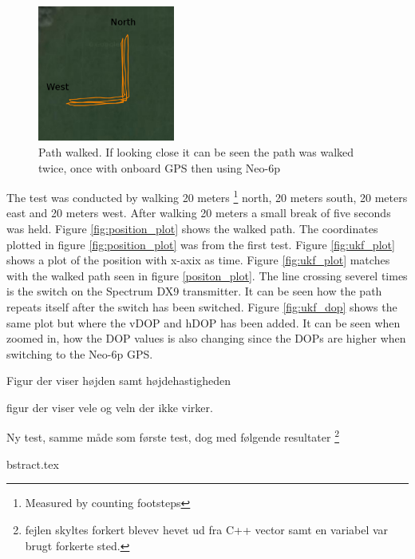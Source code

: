 \begin{figure}[H]
\centering
    \includegraphics[width=0.4\textwidth]	{graphics/test_walked_90deg.png}
	  \caption{Path walked. If looking close it can be seen the path was walked twice, once with onboard GPS then using Neo-6p}
    \label{fig:qground_station_dop}
\end{figure}
The test was conducted by walking 20 meters \footnote{Measured by counting footsteps} north, 20 meters south, 20 meters east and 20 meters west. After walking 20 meters a small break of five seconds was held. Figure \ref{fig:position_plot} shows the walked path.
The coordinates plotted in figure \ref{fig:position_plot} was from the first test. Figure \ref{fig:ukf_plot} shows a plot of the position with x-axix as time.
Figure \ref{fig:ukf_plot} matches with the walked path seen in figure \ref{positon_plot}. The line crossing severel times is the switch on the Spectrum DX9 transmitter. It can be seen how the path repeats itself after the switch has been switched.
Figure \ref{fig:ukf_dop} shows the same plot but where the vDOP and hDOP has been added. It can be seen when zoomed in, how the DOP values is also changing since the DOPs are higher when switching to the Neo-6p GPS.




Figur der viser højden samt højdehastigheden

figur der viser vele og veln der ikke virker.

Ny test, samme måde som første test, dog med følgende resultater \footnote{fejlen skyltes forkert blevev hevet ud fra C++ vector samt en variabel var brugt forkerte sted.}

\cite{kelddueholmmikkellaurentziusannab.o.jensen2015}




bstract.tex
